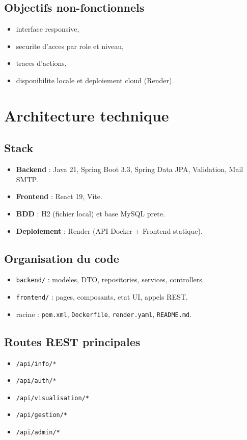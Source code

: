 \documentclass[11pt,a4paper]{article}
\begin{document}
\subsection{Objectifs non-fonctionnels}
\begin{itemize}
  \item interface responsive,
  \item securite d'acces par role et niveau,
  \item traces d'actions,
  \item disponibilite locale et deploiement cloud (Render).
\end{itemize}

\section{Architecture technique}

\subsection{Stack}
\begin{itemize}
  \item \textbf{Backend} : Java 21, Spring Boot 3.3, Spring Data JPA, Validation, Mail SMTP.
  \item \textbf{Frontend} : React 19, Vite.
  \item \textbf{BDD} : H2 (fichier local) et base MySQL prete.
  \item \textbf{Deploiement} : Render (API Docker + Frontend statique).
\end{itemize}

\subsection{Organisation du code}
\begin{itemize}
  \item \texttt{backend/} : modeles, DTO, repositories, services, controllers.
  \item \texttt{frontend/} : pages, composants, etat UI, appels REST.
  \item racine : \texttt{pom.xml}, \texttt{Dockerfile}, \texttt{render.yaml}, \texttt{README.md}.
\end{itemize}

\subsection{Routes REST principales}
\begin{itemize}
  \item \texttt{/api/info/*}
  \item \texttt{/api/auth/*}
  \item \texttt{/api/visualisation/*}
  \item \texttt{/api/gestion/*}
  \item \texttt{/api/admin/*}
\end{itemize}
\end{document}
